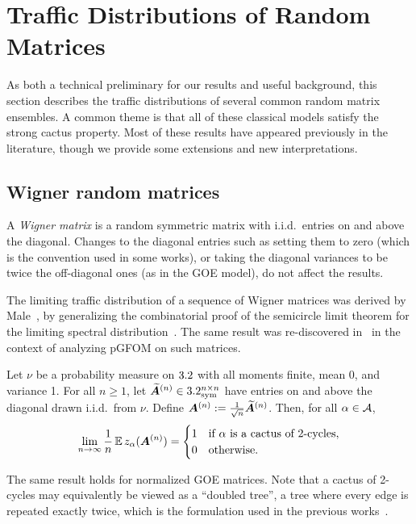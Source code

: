 \section{Traffic Distributions of Random Matrices}
\label{sec:trafficRandom}

As both a technical preliminary for our results and useful background, this section describes the traffic distributions of several common random matrix ensembles. A common theme is that all of these classical models satisfy the strong cactus property. Most of these results have appeared previously in the literature, though we provide some extensions and new interpretations.

\subsection{Wigner random matrices}
\label{sec:traffic-wigner}

A \emph{Wigner matrix} is
a random symmetric matrix with i.i.d.\ entries on and above the diagonal.
Changes to the diagonal entries such as setting them to zero (which is the convention used in some works), or taking the diagonal variances to be twice the off-diagonal ones (as in the GOE model), do not affect the results.

The limiting traffic distribution of a sequence of Wigner matrices was derived by Male~\cite{male2020traffic}, by generalizing the combinatorial
proof of the semicircle limit theorem for the limiting spectral distribution~\cite{AGZ-2010-RandomMatrices}.
The same result was re-discovered in~\cite{jones2025fourier} in the context of analyzing
pGFOM on such matrices.
\begin{theorem}
\label{thm:goe}
Let $\nu$ be a probability measure on $3.2$ with all moments finite, mean 0, and variance 1.
For all $n\ge 1$, let $\widetilde{{\bm A}}^{(n)} \in 3.2^{n \times n}_{\mathrm{sym}}$ have entries on and above the diagonal drawn i.i.d.\ from $\nu$.
Define ${\bm A}^{(n)} := \frac{1}{\sqrt{n}} \widetilde{{\bm A}}^{(n)}$.
Then, for all $\alpha \in {\cal A}$,
\[
    \lim_{n \to \infty}\frac{1}{n} \operatorname*{\mathbb{E}} z_\alpha({\bm A}^{(n)}) = \begin{cases}
        1 & \text{if $\alpha$ is a cactus of 2-cycles}, \\
        0 & \text{otherwise}.
    \end{cases}
\]
\end{theorem}
\noindent
The same result holds for normalized GOE matrices.
Note that a cactus of 2-cycles may equivalently be viewed as a ``doubled tree'', a tree where every edge is repeated exactly twice, which is the formulation used in the previous works~\cite{male2020traffic,jones2025fourier}.

